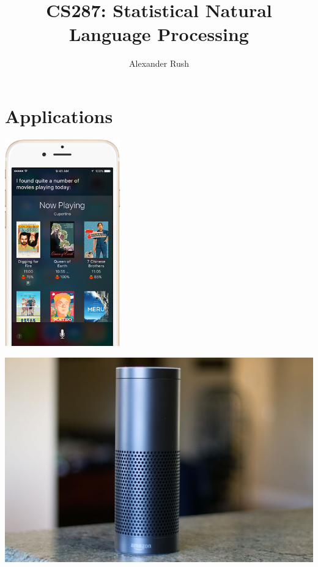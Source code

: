 \documentclass{beamer}
\title{CS287: Statistical Natural Language Processing}
\author{Alexander Rush}
\newenvironment{changemargin}{%
\begin{list}{}{%
\vspace{-1cm}
\setlength{\topsep}{0pt}%
\setlength{\leftmargin}{-1cm}%
\setlength{\rightmargin}{-1cm}%
\setlength{\listparindent}{\parindent}%
\setlength{\itemindent}{\parindent}%
\setlength{\parsep}{\parskip}%
}%
\item[]}{\end{list}}
\begin{document}
\begin{frame}
  \titlepage
\end{frame}

\section{Applications}

{

}

\begin{frame}
  \begin{center}
    \includegraphics[width=5cm]{siri}
  \end{center}
\end{frame}

\begin{frame}
  \begin{changemargin}
  \begin{center}
    \includegraphics[height=1.1\textheight]{echo}
  \end{center}
  \end{changemargin}
\end{frame}
\end{document}

